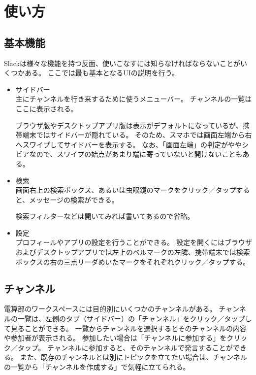 \documentclass[lualatex,ja=standard,12pt,a4j]{bxjsbook}
\begin{document}
   		\section{使い方}
        	\subsection{基本機能}
            	Slackは様々な機能を持つ反面、使いこなすには知らなければならないことがいくつかある。
                ここでは最も基本となるUIの説明を行う。
                \begin{itemize}
                	\item サイドバー\\
                    	主にチャンネルを行き来するために使うメニューバー。
                        チャンネルの一覧はここに表示される。
                        
                        ブラウザ版やデスクトップアプリ版は表示がデフォルトになっているが、携帯端末ではサイドバーが隠れている。
                        そのため、スマホでは画面左端から右へスワイプしてサイドバーを表示する。
                        なお、「画面左端」の判定がややシビアなので、スワイプの始点があまり端に寄っていないと開けないこともある。
                    \item 検索\\
                    	画面右上の検索ボックス、あるいは虫眼鏡のマークをクリック／タップすると、メッセージの検索ができる。
                        
                        検索フィルターなどは開いてみれば書いてあるので省略。
                    \item 設定\\
                    	プロフィールやアプリの設定を行うことができる。
                        設定を開くにはブラウザおよびデスクトップアプリでは左上のベルマークの左隣、携帯端末では検索ボックスの右の三点リーダめいたマークをそれぞれクリック／タップする。
                \end{itemize}
            
            \subsection{チャンネル\label{channel}}
            	電算部のワークスペースには目的別にいくつかのチャンネルがある。
            	チャンネルの一覧は、左側のタブ（サイドバー）の「チャンネル」をクリック／タップして見ることができる。
            	一覧からチャンネルを選択するとそのチャンネルの内容や参加者が表示される。
            	参加したい場合は「チャンネルに参加する」をクリック／タップ。
            	チャンネルに参加すると、そのチャンネルで発言することができる。
            	また、既存のチャンネルとは別にトピックを立てたい場合は、チャンネルの一覧から「チャンネルを作成する」で気軽に立てられる。
            
\end{document}
